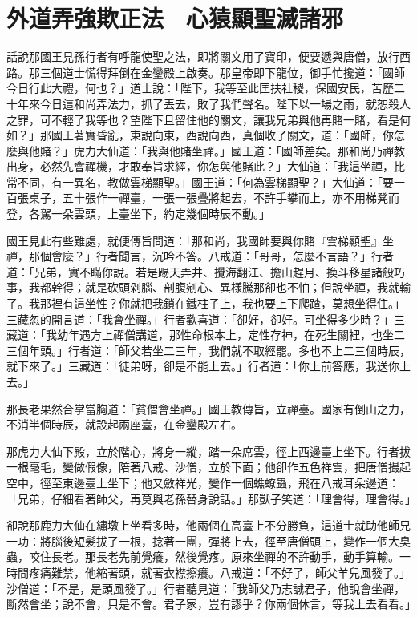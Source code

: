 
\chapter{外道弄強欺正法　心猿顯聖滅諸邪}

話說那國王見孫行者有呼龍使聖之法，即將關文用了寶印，便要遞與唐僧，放行西路。那三個道士慌得拜倒在金鑾殿上啟奏。那皇帝即下龍位，御手忙攙道：「國師今日行此大禮，何也？」道士說：「陛下，我等至此匡扶社稷，保國安民，苦歷二十年來今日這和尚弄法力，抓了丟去，敗了我們聲名。陛下以一場之雨，就恕殺人之罪，可不輕了我等也？望陛下且留住他的關文，讓我兄弟與他再賭一賭，看是何如？」那國王著實昏亂，東說向東，西說向西，真個收了關文，道：「國師，你怎麼與他賭？」虎力大仙道：「我與他賭坐禪。」國王道：「國師差矣。那和尚乃禪教出身，必然先會禪機，才敢奉旨求經，你怎與他賭此？」大仙道：「我這坐禪，比常不同，有一異名，教做雲梯顯聖。」國王道：「何為雲梯顯聖？」大仙道：「要一百張桌子，五十張作一禪臺，一張一張疊將起去，不許手攀而上，亦不用梯凳而登，各駕一朵雲頭，上臺坐下，約定幾個時辰不動。」

國王見此有些難處，就便傳旨問道：「那和尚，我國師要與你賭『雲梯顯聖』坐禪，那個會麼？」行者聞言，沉吟不答。八戒道：「哥哥，怎麼不言語？」行者道：「兄弟，實不瞞你說。若是踢天弄井、攪海翻江、擔山趕月、換斗移星諸般巧事，我都幹得；就是砍頭剁腦、剖腹剜心、異樣騰那卻也不怕；但說坐禪，我就輸了。我那裡有這坐性？你就把我鎖在鐵柱子上，我也要上下爬蹅，莫想坐得住。」三藏忽的開言道：「我會坐禪。」行者歡喜道：「卻好，卻好。可坐得多少時？」三藏道：「我幼年遇方上禪僧講道，那性命根本上，定性存神，在死生關裡，也坐二三個年頭。」行者道：「師父若坐二三年，我們就不取經罷。多也不上二三個時辰，就下來了。」三藏道：「徒弟呀，卻是不能上去。」行者道：「你上前答應，我送你上去。」

那長老果然合掌當胸道：「貧僧會坐禪。」國王教傳旨，立禪臺。國家有倒山之力，不消半個時辰，就設起兩座臺，在金鑾殿左右。

那虎力大仙下殿，立於階心，將身一縱，踏一朵席雲，徑上西邊臺上坐下。行者拔一根毫毛，變做假像，陪著八戒、沙僧，立於下面；他卻作五色祥雲，把唐僧撮起空中，徑至東邊臺上坐下；他又斂祥光，變作一個蟭蟟蟲，飛在八戒耳朵邊道：「兄弟，仔細看著師父，再莫與老孫替身說話。」那獃子笑道：「理會得，理會得。」

卻說那鹿力大仙在繡墩上坐看多時，他兩個在高臺上不分勝負，這道士就助他師兄一功：將腦後短髮拔了一根，捻著一團，彈將上去，徑至唐僧頭上，變作一個大臭蟲，咬住長老。那長老先前覺癢，然後覺疼。原來坐禪的不許動手，動手算輸。一時間疼痛難禁，他縮著頭，就著衣襟擦癢。八戒道：「不好了，師父羊兒風發了。」沙僧道：「不是，是頭風發了。」行者聽見道：「我師父乃志誠君子，他說會坐禪，斷然會坐；說不會，只是不會。君子家，豈有謬乎？你兩個休言，等我上去看看。」

